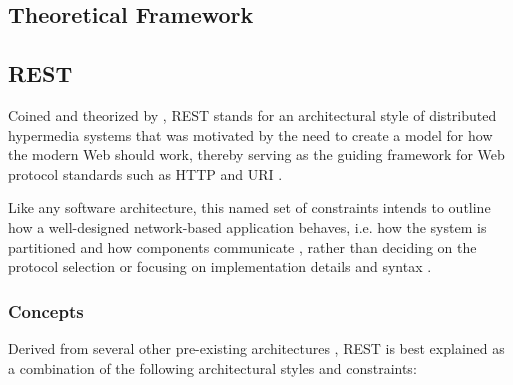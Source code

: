\begin{appendices}

\chapter{Theoretical Framework}
\label{app:theoretical-framework}

\section{\acl{REST}}
\label{sec:rest}

Coined and theorized by \citeauthor{fielding2000architectural}, \ac{REST} stands for an architectural style of distributed hypermedia systems that was motivated by the need to create a model for how the modern Web should work, thereby serving as the guiding framework for Web protocol standards such as \acs{HTTP} and \acs{URI} \cite[pp.~76,~107]{fielding2000architectural}.

Like any software architecture, this named set of constraints intends to outline how a well-designed network-based application behaves, i.e. how the system is partitioned and how components communicate \cite[p.~xvi]{fielding2000architectural}, rather than deciding on the protocol selection or focusing on implementation details and syntax \cite[pp.~86,~109]{fielding2000architectural}.


\subsection{Concepts}
\label{sec:rest-concepts}

Derived from several other pre-existing architectures \cite[p.~76]{fielding2000architectural}, \ac{REST} is best explained as a combination of the following architectural styles and constraints:


\end{appendices}
